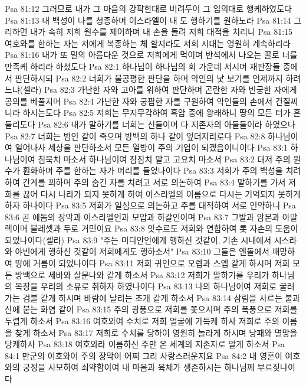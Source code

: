 Psa 81:12  그러므로 내가 그 마음의 강퍅한대로 버려두어 그 임의대로 행케하였도다
Psa 81:13  내 백성이 나를 청종하며 이스라엘이 내 도 행하기를 원하노라
Psa 81:14  그리하면 내가 속히 저희 원수를 제어하며 내 손을 돌려 저희 대적을 치리니
Psa 81:15  여호와를 한하는 자는 저에게 복종하는 체 할지라도 저희 시대는 영원히 계속하리라
Psa 81:16  내가 또 밀의 아름다운 것으로 저희에게 먹이며 반석에서 나오는 꿀로 너를 만족케 하리라 하셨도다
Psa 82:1  하나님이 하나님의 회 가운데 서시며 재판장들 중에서 판단하시되
Psa 82:2  너희가 불공평한 판단을 하며 악인의 낯 보기를 언제까지 하려느냐(셀라)
Psa 82:3  가난한 자와 고아를 위하여 판단하며 곤란한 자와 빈궁한 자에게 공의를 베풀지며
Psa 82:4  가난한 자와 궁핍한 자를 구원하여 악인들의 손에서 건질찌니라 하시는도다
Psa 82:5  저희는 무지무각하여 흑암 중에 왕래하니 땅의 모든 터가 흔들리도다
Psa 82:6  내가 말하기를 너희는 신들이며 다 지존자의 아들들이라 하였으나
Psa 82:7  너희는 범인 같이 죽으며 방백의 하나 같이 엎더지리로다
Psa 82:8  하나님이여 일어나사 세상을 판단하소서 모든 열방이 주의 기업이 되겠음이니이다
Psa 83:1  하나님이여 침묵치 마소서 하나님이여 잠잠치 말고 고요치 마소서
Psa 83:2  대저 주의 원수가 훤화하며 주를 한하는 자가 머리를 들었나이다
Psa 83:3  저희가 주의 백성을 치려 하여 간계를 꾀하며 주의 숨긴 자를 치려고 서로 의논하여
Psa 83:4  말하기를 가서 저희를 끊어 다시 나라가 되지 못하게 하여 이스라엘의 이름으로 다시는 기억되지 못하게 하자 하나이다
Psa 83:5  저희가 일심으로 의논하고 주를 대적하여 서로 언약하니
Psa 83:6  곧 에돔의 장막과 이스라엘인과 모압과 하갈인이며
Psa 83:7  그발과 암몬과 아말렉이며 블레셋과 두로 거민이요
Psa 83:8  앗수르도 저희와 연합하여 롯 자손의 도움이 되었나이다(셀라)
Psa 83:9  "주는 미디안인에게 행하신 것같이, 기손 시내에서 시스라와 야빈에게 행하신 것같이 저희에게도 행하소서"
Psa 83:10  그들은 엔돌에서 패망하여 땅에 거름이 되었나이다
Psa 83:11  저희 귀인으로 오렙과 스엡 같게 하시며 저희 모든 방백으로 세바와 살문나와 같게 하소서
Psa 83:12  저희가 말하기를 우리가 하나님의 목장을 우리의 소유로 취하자 하였나이다
Psa 83:13  나의 하나님이여 저희로 굴러가는 검불 같게 하시며 바람에 날리는 초개 같게 하소서
Psa 83:14  삼림을 사르는 불과 산에 붙는 화염 같이
Psa 83:15  주의 광풍으로 저희를 쫓으시며 주의 폭풍으로 저희를 두렵게 하소서
Psa 83:16  여호와여 수치로 저희 얼굴에 가득케 하사 저희로 주의 이름을 찾게 하소서
Psa 83:17  저희로 수치를 당하여 영원히 놀라게 하시며 낭패와 멸망을 당케하사
Psa 83:18  여호와라 이름하신 주만 온 세계의 지존자로 알게 하소서
Psa 84:1  만군의 여호와여 주의 장막이 어찌 그리 사랑스러운지요
Psa 84:2  내 영혼이 여호와의 궁정을 사모하여 쇠약함이여 내 마음과 육체가 생존하시는 하나님께 부르짖나이다
